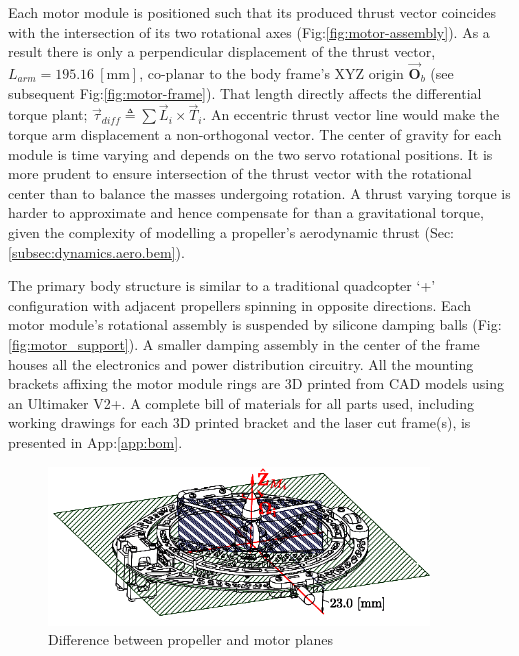Each motor module is positioned such that its produced thrust vector coincides with the intersection of its two rotational axes (Fig:\ref{fig:motor-assembly}). As a result there is only a perpendicular displacement of the thrust vector, $L_{arm}=195.16~[\text{mm}]$, co-planar to the body frame's XYZ origin $\vec{\mathbf{O}}_b$ (see subsequent Fig:\ref{fig:motor-frame}). That length directly affects the differential torque plant; $\vec{\tau}_{diff}\triangleq\sum\vec{L}_i\times\vec{T}_i$. An eccentric thrust vector line would make the torque arm displacement a non-orthogonal vector. The center of gravity for each module is time varying and depends on the two servo rotational positions. It is more prudent to ensure intersection of the thrust vector with the rotational center than to balance the masses undergoing rotation. A thrust varying torque is harder to approximate and hence compensate for than a gravitational torque, given the complexity of modelling a propeller's aerodynamic thrust (Sec:\ref{subsec:dynamics.aero.bem}).
\par
The primary body structure is similar to a traditional quadcopter `+' configuration with adjacent propellers spinning in opposite directions. Each motor module's rotational assembly is suspended by silicone damping balls (Fig:\ref{fig:motor_support}). A smaller damping assembly in the center of the frame houses all the electronics and power distribution circuitry. All the mounting brackets affixing the motor module rings are 3D printed from CAD models using an Ultimaker V2+\cite{ultimaker}. A complete bill of materials for all parts used, including working drawings for each 3D printed bracket and the laser cut frame(s), is presented in App:\ref{app:bom}.
\par
\begin{figure}[hbtp]
\centering
\includegraphics[width=0.9\textwidth]{figs/motor-prop}
\vspace{-10pt}
\caption{Difference between propeller and motor planes}
\label{fig:motor_prop}
\vspace{-15pt}
\end{figure}
